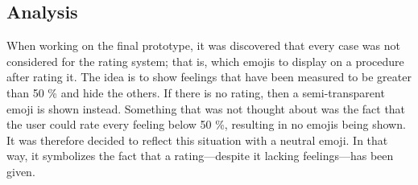 \subsection{Analysis}

When working on the final prototype, it was discovered that every case was not considered for the rating system; that is, which emojis to display on a procedure after rating it. The idea is to show feelings that have been measured to be greater than 50 \% and hide the others. If there is no rating, then a semi-transparent emoji is shown instead. Something that was not thought about was the fact that the user could rate every feeling below 50 \%, resulting in no emojis being shown. It was therefore decided to reflect this situation with a neutral emoji. In that way, it symbolizes the fact that a rating---despite it lacking feelings---has been given.
